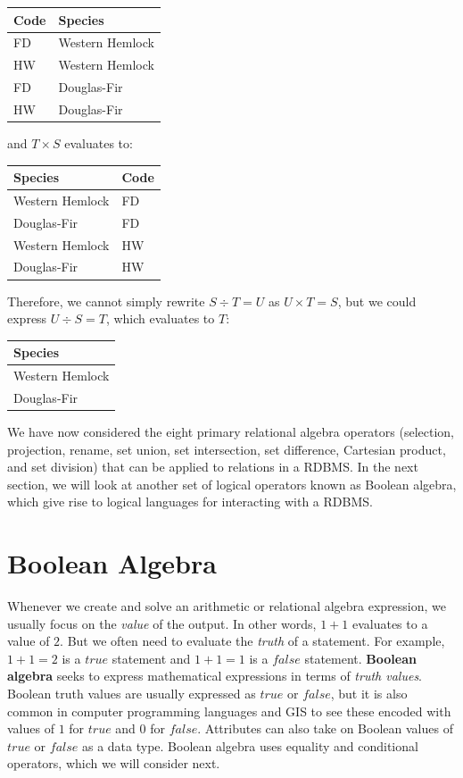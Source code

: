 \documentclass[
]{book}
\begin{document}
\begin{tabular}{ll}
\toprule
Code & Species\\
\midrule
FD & Western Hemlock\\
HW & Western Hemlock\\
FD & Douglas-Fir\\
HW & Douglas-Fir\\
\bottomrule
\end{tabular}

and \(T×S\) evaluates to:

\begin{tabular}{ll}
\toprule
Species & Code\\
\midrule
Western Hemlock & FD\\
Douglas-Fir & FD\\
Western Hemlock & HW\\
Douglas-Fir & HW\\
\bottomrule
\end{tabular}

Therefore, we cannot simply rewrite \(S÷T=U\) as \(U×T=S\), but we could express \(U÷S=T\), which evaluates to \(T\):

\begin{tabular}{l}
\toprule
Species\\
\midrule
Western Hemlock\\
Douglas-Fir\\
\bottomrule
\end{tabular}

We have now considered the eight primary relational algebra operators (selection, projection, rename, set union, set intersection, set difference, Cartesian product, and set division) that can be applied to relations in a RDBMS. In the next section, we will look at another set of logical operators known as Boolean algebra, which give rise to logical languages for interacting with a RDBMS.

\section{Boolean Algebra}\label{boolean-algebra}

Whenever we create and solve an arithmetic or relational algebra expression, we usually focus on the \emph{value} of the output. In other words, \(1+1\) evaluates to a value of \(2\). But we often need to evaluate the \emph{truth} of a statement. For example, \(1+1=2\) is a \(true\) statement and \(1+1=1\) is a \(false\) statement. \textbf{Boolean algebra} seeks to express mathematical expressions in terms of \emph{truth values}. Boolean truth values are usually expressed as \(true\) or \(false\), but it is also common in computer programming languages and GIS to see these encoded with values of \(1\) for \(true\) and \(0\) for \(false\). Attributes can also take on Boolean values of \(true\) or \(false\) as a data type. Boolean algebra uses equality and conditional operators, which we will consider next.
\end{document}
